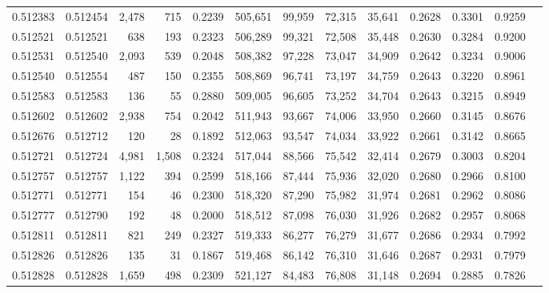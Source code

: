 \begin{tabular}{rrrrrrrrrrrrr}
0.512383 & 0.512454 & 2,478 &   715 &                                     0.2239 & 505,651 &  99,959 &  72,315 &  35,641 & 0.2628 & 0.3301 & 0.9259 \\
0.512521 & 0.512521 &   638 &   193 &                                     0.2323 & 506,289 &  99,321 &  72,508 &  35,448 & 0.2630 & 0.3284 & 0.9200 \\
0.512531 & 0.512540 & 2,093 &   539 &                                     0.2048 & 508,382 &  97,228 &  73,047 &  34,909 & 0.2642 & 0.3234 & 0.9006 \\
0.512540 & 0.512554 &   487 &   150 &                                     0.2355 & 508,869 &  96,741 &  73,197 &  34,759 & 0.2643 & 0.3220 & 0.8961 \\
0.512583 & 0.512583 &   136 &    55 &                                     0.2880 & 509,005 &  96,605 &  73,252 &  34,704 & 0.2643 & 0.3215 & 0.8949 \\
0.512602 & 0.512602 & 2,938 &   754 &                                     0.2042 & 511,943 &  93,667 &  74,006 &  33,950 & 0.2660 & 0.3145 & 0.8676 \\
0.512676 & 0.512712 &   120 &    28 &                                     0.1892 & 512,063 &  93,547 &  74,034 &  33,922 & 0.2661 & 0.3142 & 0.8665 \\
0.512721 & 0.512724 & 4,981 & 1,508 &                                     0.2324 & 517,044 &  88,566 &  75,542 &  32,414 & 0.2679 & 0.3003 & 0.8204 \\
0.512757 & 0.512757 & 1,122 &   394 &                                     0.2599 & 518,166 &  87,444 &  75,936 &  32,020 & 0.2680 & 0.2966 & 0.8100 \\
0.512771 & 0.512771 &   154 &    46 &                                     0.2300 & 518,320 &  87,290 &  75,982 &  31,974 & 0.2681 & 0.2962 & 0.8086 \\
0.512777 & 0.512790 &   192 &    48 &                                     0.2000 & 518,512 &  87,098 &  76,030 &  31,926 & 0.2682 & 0.2957 & 0.8068 \\
0.512811 & 0.512811 &   821 &   249 &                                     0.2327 & 519,333 &  86,277 &  76,279 &  31,677 & 0.2686 & 0.2934 & 0.7992 \\
0.512826 & 0.512826 &   135 &    31 &                                     0.1867 & 519,468 &  86,142 &  76,310 &  31,646 & 0.2687 & 0.2931 & 0.7979 \\
0.512828 & 0.512828 & 1,659 &   498 &                                     0.2309 & 521,127 &  84,483 &  76,808 &  31,148 & 0.2694 & 0.2885 & 0.7826 \\

\end{tabular}
